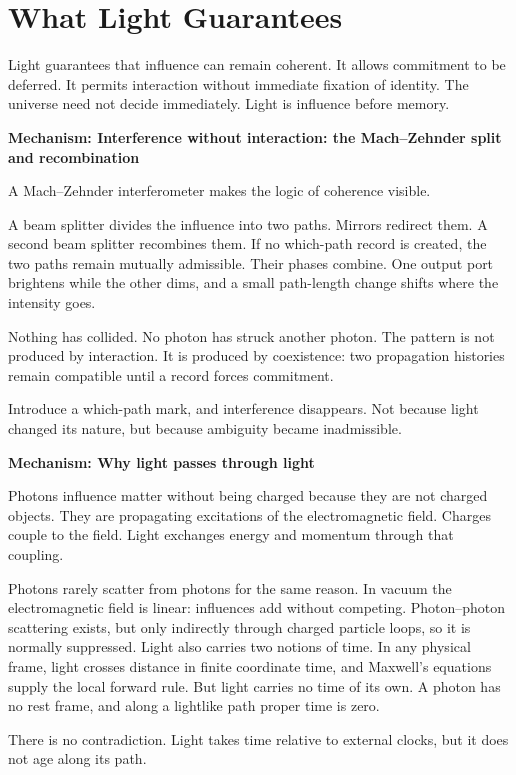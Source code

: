 \documentclass[11pt,twoside,openright]{book}
\newenvironment{mechanismbox}[1]
  {\begin{framed}\noindent\textbf{Mechanism: #1}\par\medskip}
  {\end{framed}}
\newenvironment{mechanismboxpage}[1]
  {\par\medskip
   \noindent
   \begin{minipage}{\linewidth}
   \begin{framed}
   \noindent\textbf{Mechanism: #1}\par\medskip}
  {\end{framed}
   \end{minipage}
   \par\medskip}
\begin{document}
\section*{What Light Guarantees}

Light guarantees that influence can remain coherent. It allows commitment to be deferred. It permits interaction without immediate fixation of identity. The universe need not decide immediately. Light is influence before memory.



\begin{mechanismboxpage}{Interference without interaction: the Mach--Zehnder split and recombination}
A Mach--Zehnder interferometer makes the logic of coherence visible.

A beam splitter divides the influence into two paths. Mirrors redirect them. A second beam splitter recombines them. If no which-path record is created, the two paths remain mutually admissible. Their phases combine. One output port brightens while the other dims, and a small path-length change shifts where the intensity goes.

Nothing has collided. No photon has struck another photon. The pattern is not produced by interaction. It is produced by coexistence: two propagation histories remain compatible until a record forces commitment.

Introduce a which-path mark,
and interference disappears.
Not because light changed its nature,
but because ambiguity became inadmissible.
\end{mechanismboxpage}
\begin{mechanismbox}{Why light passes through light}
Photons influence matter without being charged because they are not charged objects.
They are propagating excitations of the electromagnetic field.
Charges couple to the field.
Light exchanges energy and momentum through that coupling.

Photons rarely scatter from photons for the same reason. In vacuum the electromagnetic field is linear: influences add without competing. Photon--photon scattering exists, but only indirectly through charged particle loops, so it is normally suppressed. Light also carries two notions of time. In any physical frame, light crosses distance in finite coordinate time, and Maxwell's equations supply the local forward rule. But light carries no time of its own. A photon has no rest frame, and along a lightlike path proper time is zero.

There is no contradiction.
Light takes time relative to external clocks,
but it does not age along its path.
\end{mechanismbox}
\end{document}
